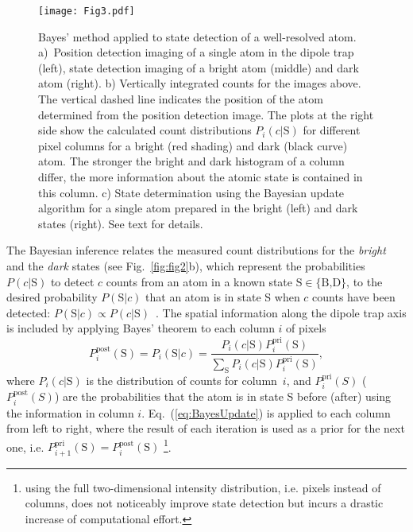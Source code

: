 \documentclass[aps,prl,twocolumn,english,showpacs]{revtex4-1}
\begin{document}
\begin{figure}[t]
\centering
    \texttt{[image: Fig3.pdf]}
  	\caption[Setup] {Bayes' method applied to state detection of a well-resolved atom. a)~Position detection imaging of a single atom in the dipole trap (left), state detection imaging of a bright atom (middle) and dark atom (right).  b) Vertically integrated counts for the images above. The vertical dashed line indicates the position of the atom determined from the position detection image.  The plots at the right side show the calculated count distributions $P_{i}(c|\text{S})$ for different pixel columns for a bright (red shading) and dark (black curve) atom. The stronger the bright and dark histogram of a column differ, the more information about the atomic state is contained in this column. c) State determination using the Bayesian update algorithm for a single atom prepared in the bright (left) and dark states (right). See text for details.} {\label{fig:fig3}}
  	\end{figure}

The Bayesian inference relates the measured count distributions for the \emph{bright} and the \emph{dark} states (see Fig.~\ref{fig:fig2}b), which represent the probabilities $P(c|\text{S})$ to detect $c$ counts from an atom in a known state $\text{S}\in\{\text{B,D}\}$, to the desired probability $P(\text{S}|c)$ that an atom is in state S when $c$ counts have been detected: $P\left(\text{S}|c\right)\propto P(c|\text{S})$~\cite{sivia2006data}. The spatial information along the dipole trap axis is included by applying Bayes' theorem to each column $i$ of pixels 
\begin{equation} \label{eq:BayesUpdate}
  P_i^{\text{post}}(\text{S})=P_{i}\left( \text{S}|c\right) =\frac{P_{i}(c|\text{S})P^{\text{pri}}_{i}(\text{S})}{\sum_\text{S} P_{i}(c|\text{S})P^{\text{pri}}_{i}(\text{S})},
\end{equation}
where $P_{i}(c|\text{S})$ is the distribution of counts for column~$i$, and $P_i^{\text{pri}}(S)$ ($P_i^{\text{post}}(S)$) are the probabilities that the atom is in state S before (after) using the information in column $i$. Eq.~(\ref{eq:BayesUpdate}) is applied to each column from left to right, where the result of each iteration is used as a prior for the next one, i.e. $P^{\text{pri}}_{i+1}(\text{S}) = P^{\text{post}}_{i}(\text{S})$ \footnote{using the full two-dimensional intensity distribution, i.e. pixels instead of columns, does not noticeably improve state detection but incurs a drastic increase of computational effort.}.
\end{document}
